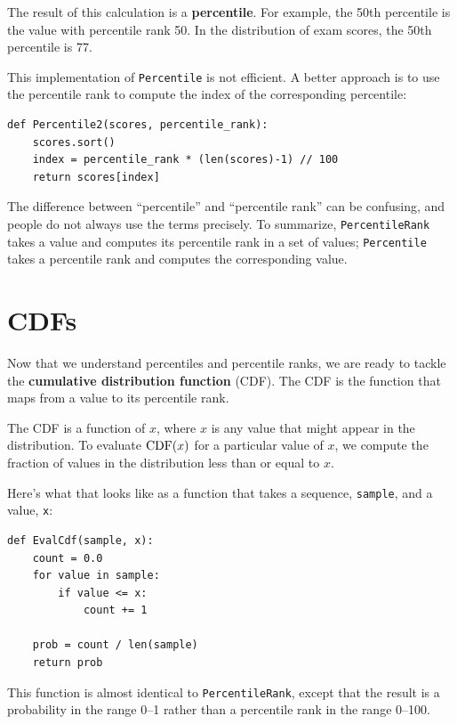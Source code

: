 \documentclass[12pt]{book}
\begin{document}
The result of this calculation is a {\bf percentile}.  For example,
the 50th percentile is the value with percentile rank 50.  In the
distribution of exam scores, the 50th percentile is 77.

This implementation of \verb"Percentile" is not efficient.  A
better approach is to use the percentile rank to compute the index of
the corresponding percentile:

\begin{verbatim}
def Percentile2(scores, percentile_rank):
    scores.sort()
    index = percentile_rank * (len(scores)-1) // 100
    return scores[index]
\end{verbatim}

The difference between ``percentile'' and ``percentile rank'' can
be confusing, and people do not always use the terms precisely.
To summarize, \verb"PercentileRank" takes a value and computes
its percentile rank in a set of values; \verb"Percentile" takes
a percentile rank and computes the corresponding value.


\section{CDFs}

Now that we understand percentiles and percentile ranks,
we are ready to tackle the {\bf cumulative distribution function}
(CDF).  The CDF is the function that maps from a value to its
percentile rank.

The CDF is a function of $x$, where $x$ is any value that might appear
in the distribution.  To evaluate $\mathrm{CDF}(x)$ for a particular value of
$x$, we compute the fraction of values in the distribution less
than or equal to $x$.

Here's what that looks like as a function that takes a sequence,
\verb"sample", and a value, \verb"x":
%
\begin{verbatim}
def EvalCdf(sample, x):
    count = 0.0
    for value in sample:
        if value <= x:
            count += 1

    prob = count / len(sample)
    return prob
\end{verbatim}

This function is almost identical to \verb"PercentileRank", except that
the result is a probability in the range 0--1 rather than a
percentile rank in the range 0--100.
\end{document}
